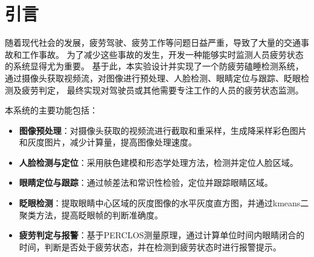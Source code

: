 \documentclass[12pt,hyperref,a4paper,UTF8]{ctexart}
\begin{document}
\cover

%
%

\thispagestyle{empty} %

\newpage
\tableofcontents

\newpage


\section{引言}

随着现代社会的发展，疲劳驾驶、疲劳工作等问题日益严重，导致了大量的交通事故和工作事故。
为了减少这些事故的发生，开发一种能够实时监测人员疲劳状态的系统显得尤为重要。
基于此，本实验设计并实现了一个防疲劳磕睡检测系统，通过摄像头获取视频流，对图像进行预处理、人脸检测、眼睛定位与跟踪、眨眼检测及疲劳判定，
最终实现对驾驶员或其他需要专注工作的人员的疲劳状态监测。

本系统的主要功能包括：
\begin{itemize}
    \item \textbf{图像预处理}：对摄像头获取的视频流进行截取和重采样，生成降采样彩色图片和灰度图片，减少计算量，提高图像处理速度。
    \item \textbf{人脸检测与定位}：采用肤色建模和形态学处理方法，检测并定位人脸区域。
    \item \textbf{眼睛定位与跟踪}：通过帧差法和常识性检验，定位并跟踪眼睛区域。
    \item \textbf{眨眼检测}：提取眼睛中心区域的灰度图像的水平灰度直方图，并通过kmeans二聚类方法，提高眨眼帧的判断准确度。
    \item \textbf{疲劳判定与报警}：基于PERCLOS测量原理，通过计算单位时间内眼睛闭合的时间，判断是否处于疲劳状态，并在检测到疲劳状态时进行报警提示。
\end{itemize}
\end{document}
